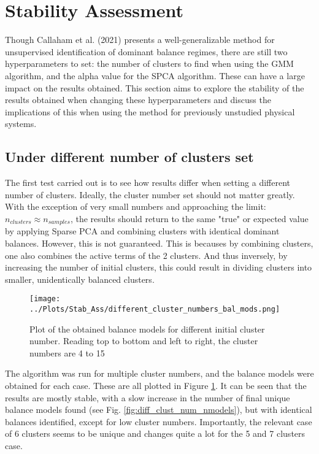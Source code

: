 \documentclass[12pt]{report} %
\begin{document}
\section{Stability Assessment}

Though Callaham et al. (2021)\cite{callaham2021learning} presents a well-generalizable method for unsupervised identification of dominant balance regimes, there are still two hyperparameters to set: the number of clusters to find when using the GMM algorithm, and the alpha value for the SPCA algorithm. These can have a large impact on the results obtained. This section aims to explore the stability of the results obtained when changing these hyperparameters and discuss the implications of this when using the method for previously unstudied physical systems.

\subsection{Under different number of clusters set}

The first test carried out is to see how results differ when setting a different number of clusters. Ideally, the cluster number set should not matter greatly. With the exception of very small numbers and approaching the limit: $n_{clusters} \approx n_{samples}$,  the results should return to the same "true" or expected value by applying Sparse PCA and combining clusters with identical dominant balances. However, this is not guaranteed. This is becauses by combining clusters, one also combines the active terms of the 2 clusters. And thus inversely, by increasing the number of initial clusters, this could result in dividing clusters into smaller, unidentically balanced clusters.

\begin{figure}[htbp]
  \centering
  \texttt{[image: ../Plots/Stab\_Ass/different\_cluster\_numbers\_bal\_mods.png]}
  \caption{Plot of the obtained balance models for different initial cluster number. Reading top to bottom and left to right, the cluster numbers are 4 to 15}
  \label{fig:diff_clust_num_bal_mods}
\end{figure}

The algorithm was run for multiple cluster numbers, and the balance models were obtained for each case. These are all plotted in Figure \ref{fig:diff_clust_num_bal_mods}. It can be seen that the results are mostly stable, with a slow increase in the number of final unique balance models found (see Fig. \ref{fig:diff_clust_num_nmodels}), but with identical balances identified, except for low cluster numbers. Importantly, the relevant case of 6 clusters seems to be unique and changes quite a lot for the 5 and 7 clusters case.
\end{document}
